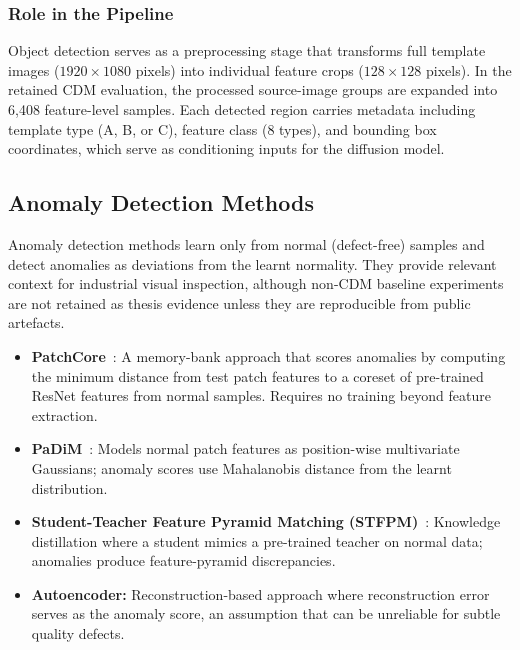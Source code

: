 \subsubsection{Role in the Pipeline}
\label{sec:bg:industrial:pipeline-role}

Object detection serves as a preprocessing stage that transforms full template images ($1920 \times 1080$ pixels) into individual feature crops ($128 \times 128$ pixels). In the retained CDM evaluation, the processed source-image groups are expanded into 6{,}408 feature-level samples. Each detected region carries metadata including template type (A, B, or C), feature class (8 types), and bounding box coordinates, which serve as conditioning inputs for the diffusion model.

\subsection{Anomaly Detection Methods}
\label{sec:bg:industrial:anomaly}

Anomaly detection methods learn only from normal (defect-free) samples and detect anomalies as deviations from the learnt normality. They provide relevant context for industrial visual inspection, although non-CDM baseline experiments are not retained as thesis evidence unless they are reproducible from public artefacts.

\begin{itemize}
    \item \textbf{PatchCore}~\cite{roth2022towards}: A memory-bank approach that scores anomalies by computing the minimum distance from test patch features to a coreset of pre-trained ResNet features from normal samples. Requires no training beyond feature extraction.
    \item \textbf{PaDiM}~\cite{defard2021padim}: Models normal patch features as position-wise multivariate Gaussians; anomaly scores use Mahalanobis distance from the learnt distribution.
    \item \textbf{Student-Teacher Feature Pyramid Matching (STFPM)}~\cite{wang2021studentteacher}: Knowledge distillation where a student mimics a pre-trained teacher on normal data; anomalies produce feature-pyramid discrepancies.
    \item \textbf{Autoencoder:} Reconstruction-based approach where reconstruction error serves as the anomaly score, an assumption that can be unreliable for subtle quality defects.
\end{itemize}

